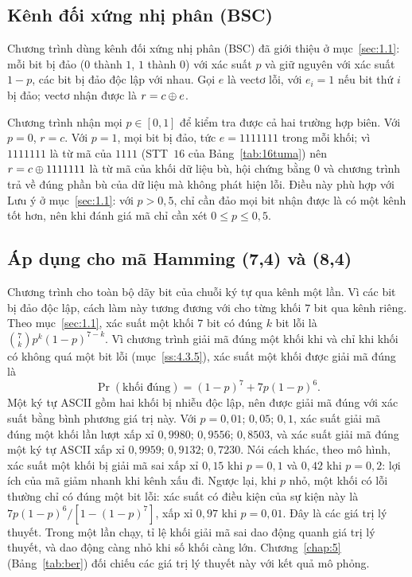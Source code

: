 \subsection{Kênh đối xứng nhị phân (BSC)}
\label{ss:4.4.2}

Chương trình dùng kênh đối xứng nhị phân (BSC) đã giới thiệu ở
mục~\ref{sec:1.1}: mỗi bit bị đảo ($0$ thành $1$, $1$ thành $0$) với xác suất
$p$ và giữ nguyên với xác suất $1 - p$, các bit bị đảo độc lập với nhau. Gọi
$e$ là vectơ lỗi, với $e_i = 1$ nếu bit thứ $i$ bị đảo; vectơ nhận được là
$r = c \oplus e$.

Chương trình nhận mọi $p \in [0,1]$ để kiểm tra được cả hai trường hợp biên.
Với $p = 0$, $r = c$. Với $p = 1$, mọi bit bị đảo, tức $e = 1111111$ trong mỗi
khối; vì $1111111$ là từ mã của $1111$ (STT~$16$ của Bảng~\ref{tab:16tuma}) nên
$r = c \oplus 1111111$ là từ mã của khối dữ liệu bù, hội chứng bằng $0$ và chương
trình trả về đúng phần bù của dữ liệu mà không phát hiện lỗi. Điều này phù hợp
với Lưu ý ở mục~\ref{sec:1.1}: với $p > 0{,}5$, chỉ cần đảo mọi bit nhận được
là có một kênh tốt hơn, nên khi đánh giá mã chỉ cần xét $0 \le p \le 0{,}5$.

\subsection{Áp dụng cho mã Hamming (7,4) và (8,4)}
\label{ss:4.4.3}

Chương trình cho toàn bộ dãy bit của chuỗi ký tự qua kênh một lần. Vì các bit
bị đảo độc lập, cách làm này tương đương với cho từng khối $7$ bit qua kênh
riêng. Theo mục~\ref{sec:1.1}, xác suất một khối $7$ bit có đúng $k$ bit lỗi là
$\binom{7}{k} p^k (1-p)^{7-k}$. Vì chương trình giải mã đúng một khối khi và chỉ
khi khối có không quá một bit lỗi (mục~\ref{ss:4.3.5}), xác suất một khối được
giải mã đúng là
\begin{equation}\label{eq:pkhoi}
  \Pr(\text{khối đúng}) = (1-p)^7 + 7p(1-p)^6 .
\end{equation}
Một ký tự ASCII gồm hai khối bị nhiễu độc lập, nên được giải mã đúng với xác
suất bằng bình phương giá trị này. Với $p = 0{,}01$; $0{,}05$; $0{,}1$, xác suất
giải mã đúng một khối lần lượt xấp xỉ $0{,}9980$; $0{,}9556$; $0{,}8503$, và
xác suất giải mã đúng một ký tự ASCII xấp xỉ $0{,}9959$; $0{,}9132$; $0{,}7230$.
Nói cách khác, theo mô hình, xác suất một khối bị giải mã sai xấp xỉ $0{,}15$
khi $p = 0{,}1$ và $0{,}42$ khi $p = 0{,}2$: lợi ích của mã giảm nhanh khi kênh
xấu đi. Ngược lại, khi $p$ nhỏ, một khối có lỗi thường chỉ có đúng một bit lỗi:
xác suất có điều kiện của sự kiện này là $7p(1-p)^6 / [1 - (1-p)^7]$, xấp xỉ
$0{,}97$ khi $p = 0{,}01$. Đây là các giá trị lý thuyết. Trong một lần chạy, tỉ
lệ khối giải mã sai dao động quanh giá trị lý thuyết, và dao động càng nhỏ khi
số khối càng lớn. Chương~\ref{chap:5} (Bảng~\ref{tab:ber}) đối chiếu các giá trị
lý thuyết này với kết quả mô phỏng.

